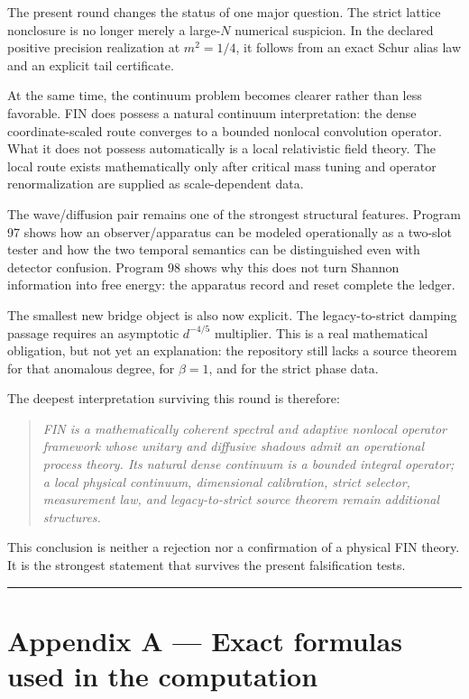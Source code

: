 \documentclass[11pt,a4paper,openany]{report}
\begin{document}
The present round changes the status of one major question. The strict lattice nonclosure is no longer merely a large-\(N\) numerical suspicion. In the declared positive precision realization at \(m^2=1/4\), it follows from an exact Schur alias law and an explicit tail certificate.

At the same time, the continuum problem becomes clearer rather than less favorable. FIN does possess a natural continuum interpretation: the dense coordinate-scaled route converges to a bounded nonlocal convolution operator. What it does not possess automatically is a local relativistic field theory. The local route exists mathematically only after critical mass tuning and operator renormalization are supplied as scale-dependent data.

The wave/\allowbreak{}diffusion pair remains one of the strongest structural features. Program 97 shows how an observer/\allowbreak{}apparatus can be modeled operationally as a two-slot tester and how the two temporal semantics can be distinguished even with detector confusion. Program 98 shows why this does not turn Shannon information into free energy: the apparatus record and reset complete the ledger.

The smallest new bridge object is also now explicit. The legacy-to-strict damping passage requires an asymptotic \(d^{-4/5}\) multiplier. This is a real mathematical obligation, but not yet an explanation: the repository still lacks a source theorem for that anomalous degree, for \(\beta=1\), and for the strict phase data.

The deepest interpretation surviving this round is therefore:

\begin{quote}\itshape
FIN is a mathematically coherent spectral and adaptive nonlocal operator framework whose unitary and diffusive shadows admit an operational process theory. Its natural dense continuum is a bounded integral operator; a local physical continuum, dimensional calibration, strict selector, measurement law, and legacy-to-strict source theorem remain additional structures.

\end{quote}

This conclusion is neither a rejection nor a confirmation of a physical FIN theory. It is the strongest statement that survives the present falsification tests.

\par\medskip\hrule\medskip

\chapter{Appendix A --- Exact formulas used in the computation}
\end{document}
